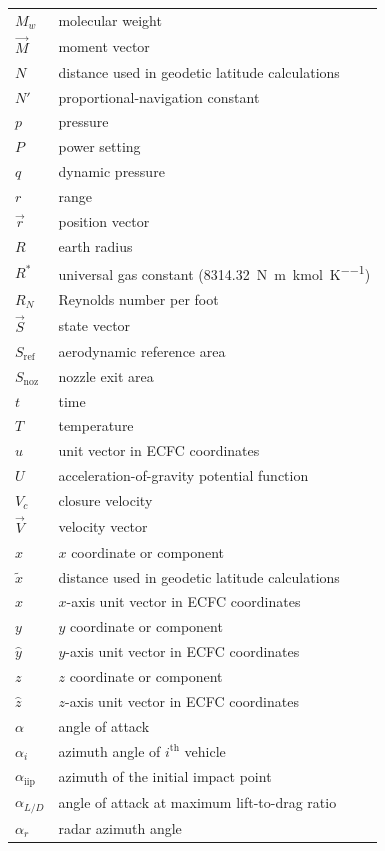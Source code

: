 \begin{longtable}{@{}>{\raggedleft\arraybackslash}p{}p{}@{}}
$M_w$ & molecular weight \\
$\vec{M}$ & moment vector \\
$N$ & distance used in geodetic latitude calculations \\
$N'$ & proportional-navigation constant \\
$p$ & pressure \\
$P$ & power setting \\
$q$ & dynamic pressure \\
$r$ & range \\
$\vec{r}$ & position vector \\
$R$ & earth radius \\
$R^*$ & universal gas constant (\SI{8314.32}{\newton\metre\per\kilo\mole\per\kelvin}) \\
$R_N$ & Reynolds number per foot \\
$\vec{S}$ & state vector \\
$S_{\mathrm{ref}}$ & aerodynamic reference area \\
$S_{\mathrm{noz}}$ & nozzle exit area \\
$t$ & time \\
$T$ & temperature \\
$\hat{u}$ & unit vector in ECFC coordinates \\
$U$ & acceleration-of-gravity potential function \\
$V_c$ & closure velocity \\
$\vec{V}$ & velocity vector \\
$x$ & $x$ coordinate or component \\
$\tilde{x}$ & distance used in geodetic latitude calculations \\
$\hat{x}$ & $x$-axis unit vector in ECFC coordinates \\
$y$ & $y$ coordinate or component \\
$\hat{y}$ & $y$-axis unit vector in ECFC coordinates \\
$z$ & $z$ coordinate or component \\
$\hat{z}$ & $z$-axis unit vector in ECFC coordinates \\
$\alpha$ & angle of attack \\
$\alpha_i$ & azimuth angle of $i^{\mathrm{th}}$ vehicle \\
$\alpha_{\mathrm{iip}}$ & azimuth of the initial impact point \\
$\alpha_{L/D}$ & angle of attack at maximum lift-to-drag ratio \\
$\alpha_r$ & radar azimuth angle \\

\end{longtable}
